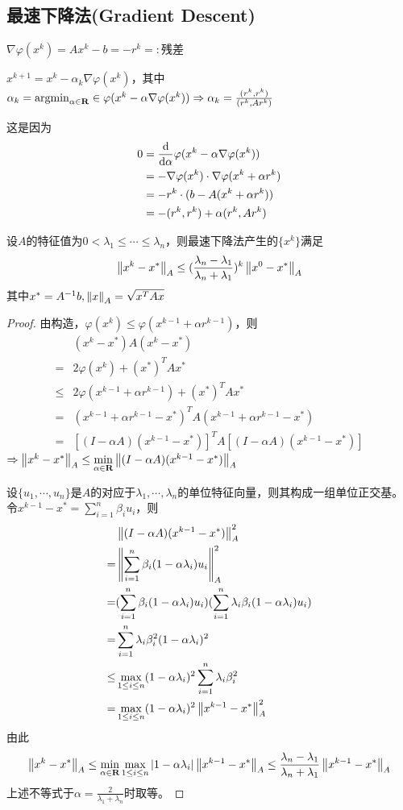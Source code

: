 \documentclass{ctexart}
\begin{document}
\subsection{最速下降法(Gradient Descent)}
$\nabla \varphi(x^k)=Ax^k-b=-r^k=:$残差

$x^{k+1}=x^k-\alpha_k\nabla\varphi(x^k)$，其中$\alpha_k=\mathrm{argmin}_{\alpha\in\mathbf{R}}\in\varphi(x^k-\alpha\nabla \varphi(x^k))\Rightarrow \alpha_k=\frac{(r^k,r^k)}{(r^k,Ar^k)}$

这是因为
\begin{align*}
0&=\frac{\mathrm{d}}{\mathrm{d}\alpha}\varphi(x^k-\alpha\nabla\varphi(x^k))\\
&=-\nabla\varphi(x^k)\cdot\nabla\varphi(x^k+\alpha r^k)\\
&=-r^k\cdot(b-A(x^k+\alpha r^k))\\
&=-(r^k,r^k)+\alpha(r^k,Ar^k)
\end{align*}

\begin{Thm}
设$A$的特征值为$0<\lambda_1\leq\cdots\leq\lambda_n$，则最速下降法产生的$\{x^k\}$满足
\[\left\|x^k-x^* \right\|_A\leq(\frac{\lambda_n-\lambda_1}{\lambda_n+\lambda_1})^k\left\|x^0-x^* \right\|_A\]
其中$x^*=A^{-1}b,\left\|x \right\|_A=\sqrt{x^TAx}$
\end{Thm}

\begin{proof}
由构造，$\varphi(x^k)\leq \varphi(x^{k-1}+\alpha r^{k-1})$，则
\begin{align*}
&(x^k-x^*)A(x^k-x^*)\\
=&2\varphi(x^k)+(x^*)^TAx^*\\
\leq& 2\varphi(x^{k-1}+\alpha r^{k-1})+(x^*)^TAx^*\\
=&(x^{k-1}+\alpha r^{k-1}-x^*)^TA(x^{k-1}+\alpha r^{k-1}-x^*)\\
=&[(I-\alpha A)(x^{k-1}-x^*)]^TA[(I-\alpha A)(x^{k-1}-x^*)]
\end{align*}
$\Rightarrow \left\|x^k-x^* \right\|_A\leq\min\limits_{\alpha\in\mathbf{R}}\left\|(I-\alpha A)(x^{k-1}-x^*) \right\|_A$

设$\{u_1,\cdots,u_n\}$是$A$的对应于$\lambda_1,\cdots,\lambda_n$的单位特征向量，则其构成一组单位正交基。令$x^{k-1}-x^*=\sum\limits_{i=1}^n \beta_iu_i$，则
\begin{align*}
&\left\|(I-\alpha A)(x^{k-1}-x^*) \right\|^2_A\\
=&\left\|\sum_{i=1}^n\beta_i(1-\alpha\lambda_i)u_i \right\|^2_A\\
=&(\sum_{i=1}^n\beta_i(1-\alpha\lambda_i)u_i)(\sum_{i=1}^n\lambda_i\beta_i(1-\alpha\lambda_i)u_i)\\
=&\sum_{i=1}^n\lambda_i\beta_i^2(1-\alpha\lambda_i)^2\\
\leq &\max_{1\leq i\leq n}(1-\alpha\lambda_i)^2\sum_{i=1}^n\lambda_i\beta_i^2\\
=&\max_{1\leq i\leq n}(1-\alpha\lambda_i)^2\left\|x^{k-1}-x^* \right\|_A^2
\end{align*}
由此
\[\left\|x^k-x^* \right\|_A\leq\min_{\alpha\in \mathbf{R}}\max_{1\leq i\leq n}|1-\alpha\lambda_i|\left\|x^{k-1}-x^* \right\|_A\leq \frac{\lambda_n-\lambda_1}{\lambda_n+\lambda_1}\left\|x^{k-1}-x^* \right\|_A\]
上述不等式于$\alpha=\frac{2}{\lambda_1+\lambda_n}$时取等。
\end{proof}
\end{document}
